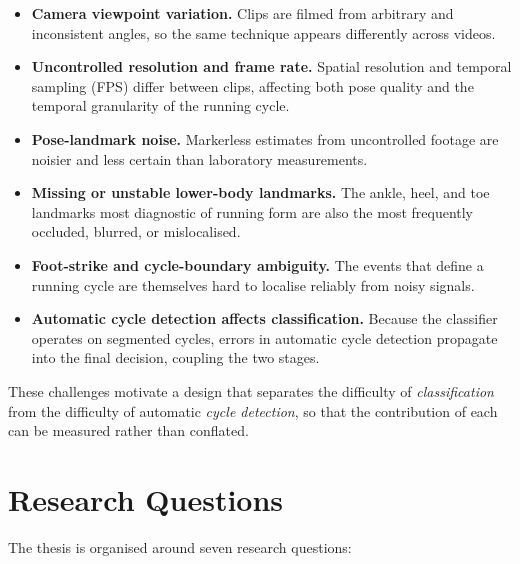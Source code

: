 \begin{itemize}
  \item \textbf{Camera viewpoint variation.} Clips are filmed from arbitrary and
        inconsistent angles, so the same technique appears differently across
        videos.
  \item \textbf{Uncontrolled resolution and frame rate.} Spatial resolution and
        temporal sampling (FPS) differ between clips, affecting both pose
        quality and the temporal granularity of the running cycle.
  \item \textbf{Pose-landmark noise.} Markerless estimates from uncontrolled
        footage are noisier and less certain than laboratory measurements.
  \item \textbf{Missing or unstable lower-body landmarks.} The ankle, heel, and
        toe landmarks most diagnostic of running form are also the most
        frequently occluded, blurred, or mislocalised.
  \item \textbf{Foot-strike and cycle-boundary ambiguity.} The events that
        define a running cycle are themselves hard to localise reliably from
        noisy signals.
  \item \textbf{Automatic cycle detection affects classification.} Because the
        classifier operates on segmented cycles, errors in automatic cycle
        detection propagate into the final decision, coupling the two stages.
\end{itemize}

These challenges motivate a design that separates the difficulty of
\emph{classification} from the difficulty of automatic \emph{cycle detection},
so that the contribution of each can be measured rather than conflated.

\section{Research Questions}
\label{sec:intro-rqs}

The thesis is organised around seven research questions:

